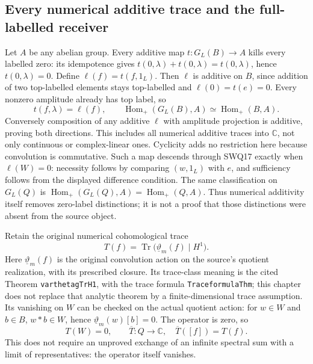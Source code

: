 \documentclass[11pt]{article}
\begin{document}
\subsection{Every numerical additive trace and the full-labelled receiver}

Let $A$ be any abelian group. Every additive map
$t:G_L(B)\to A$ kills every labelled zero: its idempotence gives
$t(0,\lambda)+t(0,\lambda)=t(0,\lambda)$, hence $t(0,\lambda)=0$.
Define $\ell(f)=t(f,1_L)$. Then $\ell$ is additive on $B$, since
addition of two top-labelled elements stays top-labelled and
$\ell(0)=t(e)=0$. Every nonzero amplitude already has top label,
so
\begin{equation}\tag{SWQ20}
 t(f,\lambda)=\ell(f),\qquad
 \operatorname{Hom}_{+}(G_L(B),A)
       \simeq\operatorname{Hom}_{+}(B,A).
\end{equation}
Conversely composition of any additive $\ell$ with amplitude
projection is additive, proving both directions. This includes all
numerical additive traces into $\mathbb C$, not only continuous or
complex-linear ones. Cyclicity adds no restriction here because
convolution is commutative. Such a map descends through SWQ17
exactly when $\ell(W)=0$: necessity follows by comparing $(w,1_L)$
with $e$, and sufficiency follows from the displayed difference
condition. The same classification on $G_L(Q)$ is
$\operatorname{Hom}_{+}(G_L(Q),A)=\operatorname{Hom}_{+}(Q,A)$.
Thus numerical additivity itself removes zero-label distinctions;
it is not a proof that those distinctions were absent from the
source object.

Retain the original numerical cohomological trace
\begin{equation}\tag{SWQ21}
 T(f)=\operatorname{Tr}\bigl(\underline\vartheta_m(f)\mid H^1\bigr).
\end{equation}
Here $\underline\vartheta_m(f)$ is the original convolution action
on the source's quotient realization, with its prescribed closure.
Its trace-class meaning is the cited Theorem
\texttt{varthetagTrH1}, with the trace formula
\texttt{TraceformulaThm}; this chapter does not replace that
analytic theorem by a finite-dimensional trace assumption.
Its vanishing on $W$ can be checked on the actual quotient action:
for $w\in W$ and $b\in B$, $w*b\in W$, hence
$\underline\vartheta_m(w)[b]=0$. The operator is zero, so
\begin{equation}\tag{SWQ22}
 T(W)=0,\qquad \overline T:Q\to\mathbb C,\quad
 \overline T([f])=T(f).
\end{equation}
This does not require an unproved exchange of an infinite spectral
sum with a limit of representatives: the operator itself vanishes.
\end{document}
